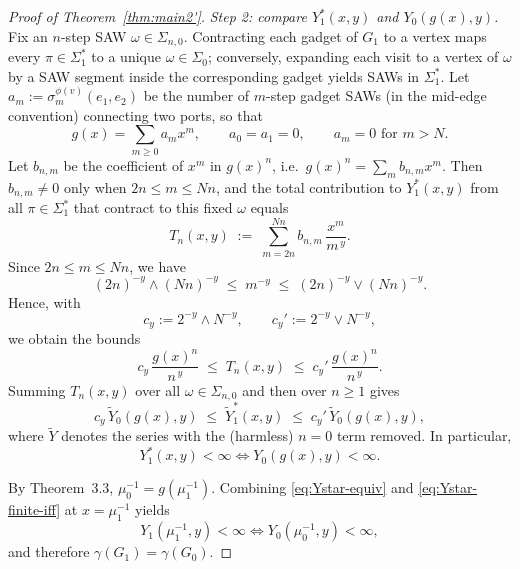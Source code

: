 \documentclass[12pt]{amsart}
\theoremstyle{plain}
\numberwithin{equation}{section}
\numberwithin{theorem}{section}
\numberwithin{figure}{section}
\begin{document}
\begin{proof}[Proof of Theorem~\ref{thm:main2'}]
\smallskip\noindent
\emph{Step 2: compare $Y_1^\ast(x,y)$ and $Y_0(g(x),y)$.}
Fix an $n$-step SAW $\omega\in\Sigma_{n,0}$.  Contracting each gadget of $G_1$ to a vertex
maps every $\pi\in\Sigma_1^\ast$ to a unique $\omega\in\Sigma_0$; conversely, expanding each visit
to a vertex of $\omega$ by a SAW segment inside the corresponding gadget yields SAWs in $\Sigma_1^\ast$.
Let $a_m:=\sigma^{\phi(v)}_{m}(e_1,e_2)$ be the number of $m$-step gadget SAWs (in the mid-edge convention)
connecting two ports, so that
\[
g(x)=\sum_{m\ge 0} a_m x^{m},
\qquad a_0=a_1=0,\qquad a_m=0 \text{ for } m>N.
\]
Let $b_{n,m}$ be the coefficient of $x^m$ in $g(x)^n$, i.e.\ $g(x)^n=\sum_m b_{n,m}x^m$.
Then $b_{n,m}\neq 0$ only when $2n\le m\le Nn$, and the total contribution to $Y_1^\ast(x,y)$
from all $\pi\in\Sigma_1^\ast$ that contract to this fixed $\omega$ equals
\[
T_n(x,y)\;:=\;\sum_{m=2n}^{Nn} b_{n,m}\,\frac{x^{m}}{m^{\,y}}.
\]
Since $2n\le m\le Nn$, we have
\[
(2n)^{-y}\wedge (Nn)^{-y}\;\le\; m^{-y}\;\le\;(2n)^{-y}\vee (Nn)^{-y}.
\]
Hence, with
\[
c_y := 2^{-y}\wedge N^{-y},
\qquad
c_y' := 2^{-y}\vee N^{-y},
\]
we obtain the bounds
\[
c_y\,\frac{g(x)^n}{n^{\,y}}
\;\le\;
T_n(x,y)
\;\le\;
c_y'\,\frac{g(x)^n}{n^{\,y}}.
\]
Summing $T_n(x,y)$ over all $\omega\in\Sigma_{n,0}$ and then over $n\ge 1$ gives
\begin{equation}\label{eq:Ystar-Y0-compare}
c_y\,\widetilde Y_0(g(x),y)\;\le\;\widetilde Y_1^\ast(x,y)\;\le\;c_y'\,\widetilde Y_0(g(x),y),
\end{equation}
where $\widetilde Y$ denotes the series with the (harmless) $n=0$ term removed.
In particular,
\begin{equation}\label{eq:Ystar-finite-iff}
Y_1^\ast(x,y)<\infty \iff Y_0(g(x),y)<\infty .
\end{equation}

By Theorem~3.3, $\mu_0^{-1}=g(\mu_1^{-1})$.  Combining \eqref{eq:Ystar-equiv} and \eqref{eq:Ystar-finite-iff}
at $x=\mu_1^{-1}$ yields
\[
Y_1(\mu_1^{-1},y)<\infty \iff Y_0(\mu_0^{-1},y)<\infty,
\]
and therefore $\gamma(G_1)=\gamma(G_0)$.


\end{proof}
\end{document}
